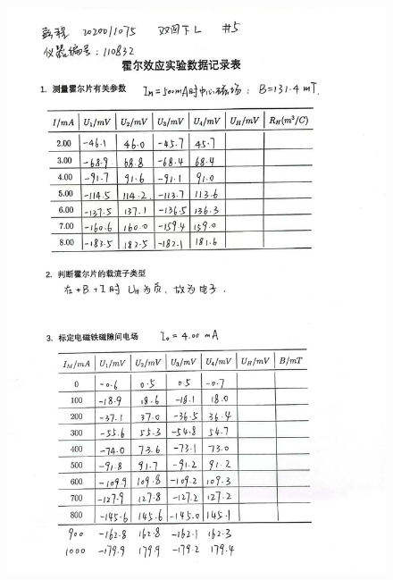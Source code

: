 \documentclass[UTF8]{ctexart}
\begin{document}
\begin{figure}[H]
  \centering
  \includegraphics[scale=0.3]{记录1.jpg}
\end{figure}
\end{document}
